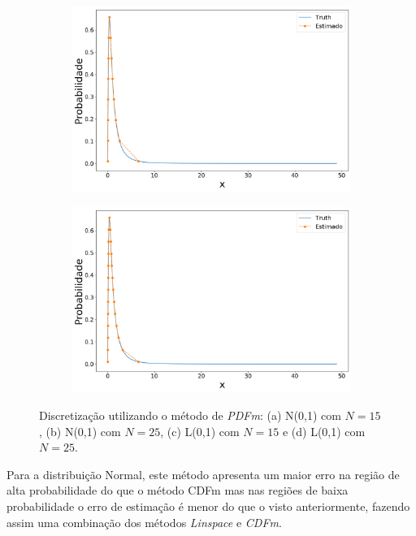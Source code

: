 \begin{figure}[H]
	\begin{subfigure}[b]{0.45\textwidth}
		\centering 
		\includegraphics[width=\linewidth]{./figuras/PDFm_lognormal_15}
		\caption{}
		\label{fig:pdflognorm15}
	\end{subfigure}
	\hfill
	\begin{subfigure}[b]{0.45\textwidth}
		\centering 
		\includegraphics[width=\linewidth]{./figuras/PDFm_lognormal_25}
		\caption{}
		\label{fig:pdflognorm25}
	\end{subfigure}
	
	\caption{Discretização utilizando o método de \textit{PDFm}: (a) N(0,1) com $N = 15$, (b) N(0,1) com $N = 25$, (c) L(0,1) com $N = 15$ e (d) L(0,1) com $N = 25$.}
	\label{fig:pdfmnorm}
\end{figure}



Para a distribuição Normal, este método apresenta um maior erro na região de alta probabilidade do que o método \ac{CDFm} mas nas regiões de baixa probabilidade o erro de estimação é menor do que o visto anteriormente, fazendo assim uma combinação dos métodos \textit{Linspace} e \textit{CDFm}.


